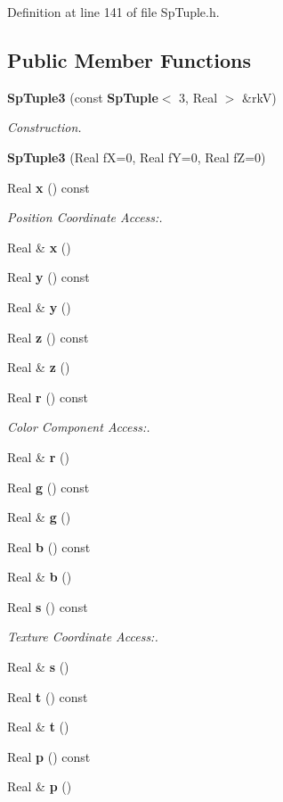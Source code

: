 Definition at line 141 of file Sp\-Tuple.h.\subsection*{Public Member Functions}
\begin{CompactItemize}
\item 
{\bf Sp\-Tuple3} (const {\bf Sp\-Tuple}$<$ 3, Real $>$ \&rk\-V)
\begin{CompactList}\small\item\em Construction. \item\end{CompactList}\item 
{\bf Sp\-Tuple3} (Real f\-X=0, Real f\-Y=0, Real f\-Z=0)
\item 
Real {\bf x} () const
\begin{CompactList}\small\item\em Position Coordinate Access:. \item\end{CompactList}\item 
Real \& {\bf x} ()
\item 
Real {\bf y} () const
\item 
Real \& {\bf y} ()
\item 
Real {\bf z} () const
\item 
Real \& {\bf z} ()
\item 
Real {\bf r} () const
\begin{CompactList}\small\item\em Color Component Access:. \item\end{CompactList}\item 
Real \& {\bf r} ()
\item 
Real {\bf g} () const
\item 
Real \& {\bf g} ()
\item 
Real {\bf b} () const
\item 
Real \& {\bf b} ()
\item 
Real {\bf s} () const
\begin{CompactList}\small\item\em Texture Coordinate Access:. \item\end{CompactList}\item 
Real \& {\bf s} ()
\item 
Real {\bf t} () const
\item 
Real \& {\bf t} ()
\item 
Real {\bf p} () const
\item 
Real \& {\bf p} ()
\end{CompactItemize}


